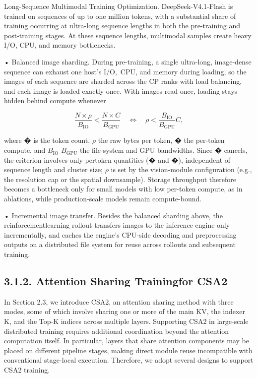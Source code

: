 \documentclass[
  10
]{article}
\begin{document}
Long-Sequence Multimodal Training Optimization. DeepSeek-V4.1-Flash is
trained on sequences of up to one million tokens, with a substantial
share of training occurring at ultra-long sequence lengths in both the
pre-training and post-training stages. At these sequence lengths,
multimodal samples create heavy I/O, CPU, and memory bottlenecks.

• Balanced image sharding. During pre-training, a single ultra-long,
image-dense sequence can exhaust one host's
\(\mathrm { I } / \mathrm { O } ,\) CPU, and memory during loading, so
the images of each sequence are sharded across the CP ranks with load
balancing, and each image is loaded exactly once. With images read once,
loading stays hidden behind compute whenever

\[
\frac { N \times \rho } { B _ { \mathrm { I O } } } < \frac { N \times C } { B _ { \mathrm { G P U } } } \quad \Longleftrightarrow \quad \rho < \frac { B _ { \mathrm { I O } } } { B _ { \mathrm { G P U } } } C ,
\]

where � is the token count, \(\rho\) the raw bytes per token, � the
per-token compute, and \(B _ { \mathrm { I O } }\)
\(B _ { \mathrm { G P U } }\) the file-system and GPU bandwidths. Since
� cancels, the criterion involves only pertoken quantities (� and �),
independent of sequence length and cluster size; \(\rho\) is set by the
vision-module configuration (e.g., the resolution cap or the spatial
downsample). Storage throughput therefore becomes a bottleneck only for
small models with low per-token compute, as in ablations, while
production-scale models remain compute-bound.

• Incremental image transfer. Besides the balanced sharding above, the
reinforcementlearning rollout transfers images to the inference engine
only incrementally, and caches the engine's CPU-side decoding and
preprocessing outputs on a distributed file system for reuse across
rollouts and subsequent training.

\subsection{3.1.2. Attention Sharing Trainingfor
CSA2}\label{attention-sharing-trainingfor-csa2}

In Section 2.3, we introduce CSA2, an attention sharing method with
three modes, some of which involve sharing one or more of the main KV,
the indexer K, and the Top-K indices across multiple layers. Supporting
CSA2 in large-scale distributed training requires additional
coordination beyond the attention computation itself. In particular,
layers that share attention components may be placed on different
pipeline stages, making direct module reuse incompatible with
conventional stage-local execution. Therefore, we adopt several designs
to support CSA2 training.
\end{document}
